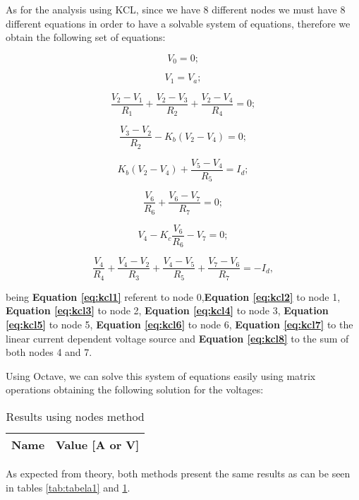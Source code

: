 As for the analysis using KCL, since we have 8 different nodes we must have 8 different equations
in order to have a solvable system of equations, therefore we obtain the following set of equations:

\begin{equation}
  V_0 = 0;
  \label{eq:kcl1}
\end{equation}

\begin{equation}
  V_1 = V_a;
  \label{eq:kcl2}
\end{equation}

\begin{equation}
  \frac{V_2 - V_1}{R_1} + \frac{V_2 - V_3}{R_2} + \frac{V_2 - V_4}{R_4}= 0;
  \label{eq:kcl3}
\end{equation}

\begin{equation}
  \frac{V_3 - V_2}{R_2} - K_b(V_2 - V_4) = 0;
  \label{eq:kcl4}
\end{equation}

\begin{equation}
  K_b(V_2 - V_4) + \frac{V_5 - V_4}{R_5} = I_d;
  \label{eq:kcl5}
\end{equation}

\begin{equation}
  \frac{V_6}{R_6} + \frac{V_6 - V_7}{R_7} = 0;
  \label{eq:kcl6}
\end{equation}

\begin{equation}
  V_4 - K_c\frac{V_6}{R_6} - V_7 =0;
  \label{eq:kcl7}
\end{equation}

\begin{equation}
  \frac{V_4}{R_4} + \frac{V_4 - V_2}{R_3} + \frac{V_4 - V_5}{R_5} + \frac{V_7 - V_6}{R_7} = -I_d,
  \label{eq:kcl8}
\end{equation}

\vspace{0.2cm}

being \textbf{Equation \ref{eq:kcl1}} referent to node 0,\textbf{Equation \ref{eq:kcl2}} to node 1, \textbf{Equation \ref{eq:kcl3}} to node 2,
\textbf{Equation \ref{eq:kcl4}} to node 3, \textbf{Equation \ref{eq:kcl5}} to node 5, \textbf{Equation \ref{eq:kcl6}} to node 6, \textbf{Equation \ref{eq:kcl7}}
to the linear current dependent voltage source and \textbf{Equation \ref{eq:kcl8}} to the sum of both nodes 4 and 7.

Using Octave, we can solve this system of equations easily using matrix operations obtaining the following
solution for the voltages:

\begin{table}[h]
  \centering
  \begin{tabular}{|l|r|}
    \hline    
    {\bf Name} & {\bf Value [A or V]} \\ \hline
    
  \end{tabular}
  \caption{Results using nodes method}
  \label{tab:tabela2}
\end{table}

As expected from theory, both methods present the same results as can be seen in tables \ref{tab:tabela1} and \ref{tab:tabela2}.

